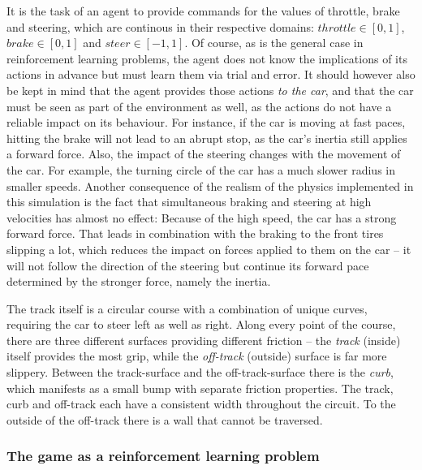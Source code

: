 It is the task of an agent to provide commands for the values of throttle, brake and steering, which are continous in their respective domains: $throttle \in [0,1]$, $brake \in [0,1]$ and $steer \in[-1,1]$. Of course, as is the general case in reinforcement learning problems, the agent does not know the implications of its actions in advance but must learn them via trial and error. It should however also be kept in mind that the agent provides those actions \textit{to the car}, and that the car must be seen as part of the environment as well, as the actions do not have a reliable impact on its behaviour. For instance, if the car is moving at fast paces, hitting the brake will not lead to an abrupt stop, as the car's inertia still applies a forward force. %
Also, the impact of the steering changes with the movement of the car. For example, the turning circle of the car has a much slower radius in smaller speeds. Another consequence of the realism of the physics implemented in this simulation is the fact that simultaneous braking and steering at high velocities has almost no effect: Because of the high speed, the car has a strong forward force. That leads in combination with the braking to the front tires slipping a lot, which reduces the impact on forces applied to them on the car -- it will not follow the direction of the steering but continue its forward pace determined by the stronger force, namely the inertia.

The track itself is a circular course with a combination of unique curves, requiring the car to steer left as well as right. Along every point of the course, there are three different surfaces providing different friction -- the \textit{track} (inside) itself provides the most grip, while the \textit{off-track} (outside) surface is far more slippery. Between the track-surface and the off-track-surface there is the \textit{curb}, which manifests as a small bump with separate friction properties. The track, curb and off-track each have a consistent width throughout the circuit. To the outside of the off-track there is a wall that cannot be traversed.

\subsubsection{The game as a reinforcement learning problem}

